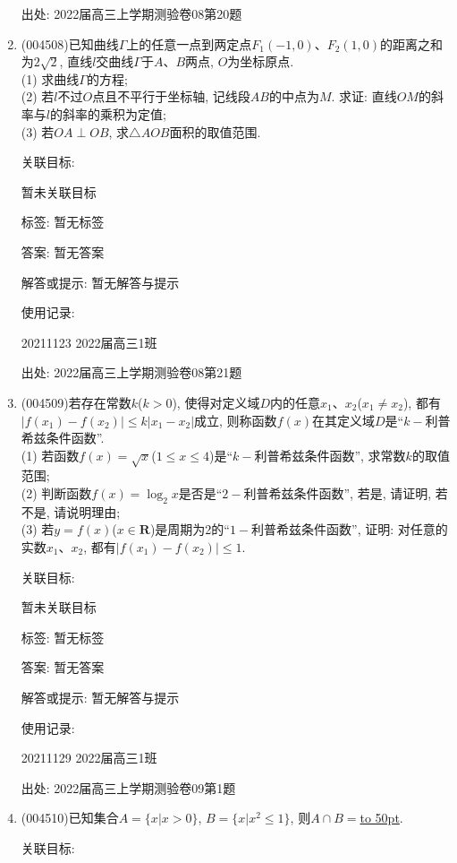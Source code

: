 \documentclass[10pt,a4paper]{article}
\newcommand{\blank}[1]{\underline{\hbox to #1pt{}}}
\begin{document}
\begin{enumerate}[1.]
出处: 2022届高三上学期测验卷08第20题
\item { (004508)}已知曲线$\Gamma$上的任意一点到两定点$F_1(-1,0)$、$F_2(1,0)$的距离之和为$2\sqrt 2$, 直线$l$交曲线$\Gamma$于$A$、$B$两点, $O$为坐标原点.\\
(1) 求曲线$\Gamma$的方程;\\
(2) 若$l$不过$O$点且不平行于坐标轴, 记线段$AB$的中点为$M$. 求证: 直线$OM$的斜率与$l$的斜率的乘积为定值;\\
(3) 若$OA\perp OB$, 求$\triangle AOB$面积的取值范围.


关联目标:

暂未关联目标



标签: 暂无标签

答案: 暂无答案

解答或提示: 暂无解答与提示

使用记录:

20211123	2022届高三1班			


出处: 2022届高三上学期测验卷08第21题
\item { (004509)}若存在常数$k$($k>0$), 使得对定义域$D$内的任意$x_1$、$x_2$($x_1\ne x_2$), 都有$|f(x_1)-f(x_2)|\le k|x_1-x_2|$成立, 则称函数$f(x)$在其定义域$D$是``$k-$利普希兹条件函数''.\\
(1) 若函数$f(x)=\sqrt x$($1\le x\le 4$)是``$k-$利普希兹条件函数'', 求常数$k$的取值范围;\\
(2) 判断函数$f(x)=\log_2x$是否是``$2-$利普希兹条件函数'', 若是, 请证明, 若不是, 请说明理由;\\
(3) 若$y=f(x)$($x\in \mathbf{R}$)是周期为2的``$1-$利普希兹条件函数'', 证明: 对任意的实数$x_1$、$x_2$, 都有$|f(x_1)-f(x_2)|\le 1$.


关联目标:

暂未关联目标



标签: 暂无标签

答案: 暂无答案

解答或提示: 暂无解答与提示

使用记录:

20211129	2022届高三1班	


出处: 2022届高三上学期测验卷09第1题
\item { (004510)}已知集合$A=\{x|x>0\}$, $B=\{x|x^2\le 1\}$, 则$A\cap B=$\blank{50}.


关联目标:


\end{enumerate}
\end{document}
